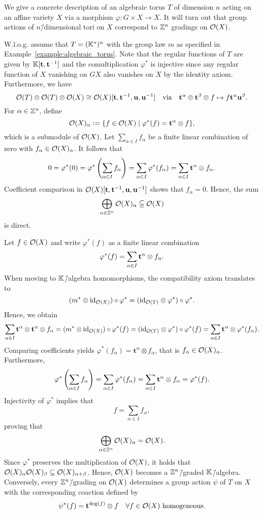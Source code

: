 \begin{construction}
	\label{construction:algebraic_torus}
	We give a concrete description of an algebraic torus $T$ of dimension $n$ acting on an affine variety $X$ via a morphism $\varphi\colon G\times X \rightarrow X$. It will turn out that group actions of $n$\=/dimensional tori on $X$ correspond to $\mathbb{Z}^n$ gradings on $\mathcal{O}(X)$.
	
	W.l.o.g. assume that $T = (\mathbb{K}^*)^n$ with the group law $m$ as specified in Example~\ref{example:algebraic_torus}. Note that the regular functions of $T$ are given by $\mathbb{K}[\mathbf{t},\mathbf{t}^{-1}]$ and the comultiplication $\varphi^*$ is injective since any regular function of $X$ vanishing on $GX$ also vanishes on $X$ by the identity axiom. Furthermore, we have $$\mathcal{O}(T)\otimes\mathcal{O}(T)\otimes\mathcal{O}(X)\cong\mathcal{O}(X)[\mathbf{t},\mathbf{t}^{-1},\mathbf{u},\mathbf{u}^{-1}]\quad\text{via}\quad\mathbf{t}^\alpha \otimes \mathbf{t}^\beta \otimes f \mapsto f\mathbf{t}^\alpha\mathbf{u}^\beta.$$
	For $\alpha\in\mathbb{Z}^n$, define
	$$\mathcal{O}(X)_\alpha \mathrel{\mathop:}= \{f\in\mathcal{O}(X)\mid \varphi^*(f) = \mathbf{t}^\alpha \otimes f\},$$
	which is a submodule of $\mathcal{O}(X)$. Let $\sum_{\alpha\in I} f_\alpha$ be a finite linear combination of zero with $f_\alpha\in\mathcal{O}(X)_\alpha$. It follows that
	$$0 = \varphi^*(0) = \varphi^*\left(\sum_{\alpha\in I} f_\alpha\right) = \sum_{\alpha\in I} \varphi^*(f_\alpha) = \sum_{\alpha\in I} \mathbf{t}^\alpha \otimes f_\alpha.$$
	Coefficient comparison in $\mathcal{O}(X)[\mathbf{t},\mathbf{t}^{-1},\mathbf{u},\mathbf{u}^{-1}]$ shows that $f_\alpha = 0$. Hence, the sum
	$$\bigoplus_{\alpha\in\mathbb{Z}^n} \mathcal{O}(X)_\alpha \subseteqq \mathcal{O}(X)$$
	is direct.

	Let $f\in \mathcal{O}(X)$ and write $\varphi^*(f)$ as a finite linear combination
	$$\varphi^*(f) = \sum_{\alpha\in I} \mathbf{t}^\alpha \otimes f_\alpha.$$
	When moving to $\mathbb{K}$\=/algebra homomorphisms, the compatibility axiom translates to
	$$(m^* \otimes \text{id}_{\mathcal{O}(X)}) \circ \varphi^* = (\text{id}_{\mathcal{O}(T)} \otimes \varphi^*) \circ \varphi^*.$$
	Hence, we obtain
	$$\sum_{\alpha\in I} \mathbf{t}^\alpha \otimes \mathbf{t}^\alpha \otimes f_\alpha = (m^* \otimes \text{id}_{\mathcal{O}(X)}) \circ \varphi^*(f) =  (\text{id}_{\mathcal{O}(T)} \otimes \varphi^*) \circ \varphi^*(f) = \sum_{\alpha\in I}\mathbf{t}^\alpha \otimes \varphi^*(f_\alpha).$$
	Comparing coefficients yields $\varphi^*(f_\alpha) = \mathbf{t}^\alpha \otimes f_\alpha$, that is $f_\alpha\in \mathcal{O}(X)_\alpha$. Furthermore,
	$$\varphi^*\left(\sum_{\alpha\in I} f_\alpha\right) = \sum_{\alpha\in I} \varphi^*(f_\alpha) = \sum_{\alpha\in I} \mathbf{t}^\alpha \otimes f_\alpha = \varphi^*(f).$$
	Injectivity of $\varphi^*$ implies that
	$$f = \sum_{\alpha\in I} f_\alpha,$$
	proving that
	$$\bigoplus_{\alpha\in\mathbb{Z}^n} \mathcal{O}(X)_\alpha = \mathcal{O}(X).$$
	Since $\varphi^*$ preserves the multiplication of $\mathcal{O}(X)$, it holds that $\mathcal{O}(X)_\alpha \mathcal{O}(X)_\beta \subseteq \mathcal{O}(X)_{\alpha+\beta}$. Hence, $\mathcal{O}(X)$ becomes a $\mathbb{Z}^n$\=/graded $\mathbb{K}$\=/algebra. Conversely, every $\mathbb{Z}^n$\=/grading on $\mathcal{O}(X)$ determines a group action $\psi$ of $T$ on $X$ with the corresponding coaction defined by 
	$$\psi^*(f) = \mathbf{t}^{\deg(f)}\otimes f\quad \forall f\in\mathcal{O}(X)\ \mathrm{homogeneous}.$$
	

\end{construction}
